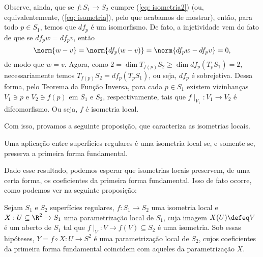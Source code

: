 Observe, ainda, que se \( f : S_{ 1 } \to S_{ 2 } \) cumpre (\ref{eq: isometria2}) (ou, equivalentemente, (\ref{eq: isometria}), pelo que acabamos de mostrar), então, para todo \( p \in S_{ 1 } \), temos que \( df_{ p } \) é um isomorfismo.
De fato, a injetividade vem do fato de que se \( df_{ p }w = df_{ p }v \), então
\begin{equation*}
    \norm{ w - v } = \norm{ df_{ p } ( w - v ) } = \norm{ df_{ p }w - df_{ p }v } = 0
,\end{equation*}
de modo que \( w = v \).
Agora, como \( 2 = \dim T_{ f ( p ) } S_{ 2 } \geq \dim df_{ p } ( T_{ p } S_{ 1 } ) = 2 \), necessariamente temos \( T_{ f ( p ) } S_{ 2 } = df_{ p } ( T_{ p } S_{ 1 } ) \), ou seja, \( df_{ p } \) é sobrejetiva.
Dessa forma, pelo Teorema da Função Inversa, para cada \( p \in S_{ 1 } \) existem vizinhanças \( V_{ 1 } \ni p \) e \( V_{ 2 } \ni f ( p ) \) em \( S_{ 1 } \) e \( S_{ 2 } \), respectivamente, tais que \( f\mid_{ V_{ 1 } } : V_{ 1 } \to V_{ 2 } \) é difeomorfismo.
Ou seja, \( f \) é isometria local.

Com isso, provamos a seguinte proposição, que caracteriza as isometrias locais.
\begin{prop}
    Uma aplicação entre superfícies regulares é uma isometria local se, e somente se, preserva a primeira forma fundamental.
\end{prop}

Dado esse resultado, podemos esperar que isometrias locais preservem, de uma certa forma, os coeficientes da primeira forma fundamental.
Isso de fato ocorre, como podemos ver na seguinte proposição:

\begin{prop}
    Sejam \( S_{ 1 } \) e \( S_{ 2 } \) superfícies regulares, \( f : S_{ 1 } \to S_{ 2 } \) uma isometria local e \( X : U \subseteq \R^{ 2 } \to S_{ 1 } \) uma parametrização local de \( S_{ 1 } \), cuja imagem \( X ( U ) \defeq V \) é um aberto de \( S_{ 1 } \) tal que \( f \mid_{ V } : V \to f ( V ) \subseteq S_{ 2 } \) é uma isometria.
    Sob essas hipóteses, \( Y = f \circ X : U \to S^{ 2 } \) é uma parametrização local de \( S_{ 2 } \), cujos coeficientes da primeira forma fundamental coincidem com aqueles da parametrização \( X \).
    \label{conserva primeira forma}
\end{prop}

